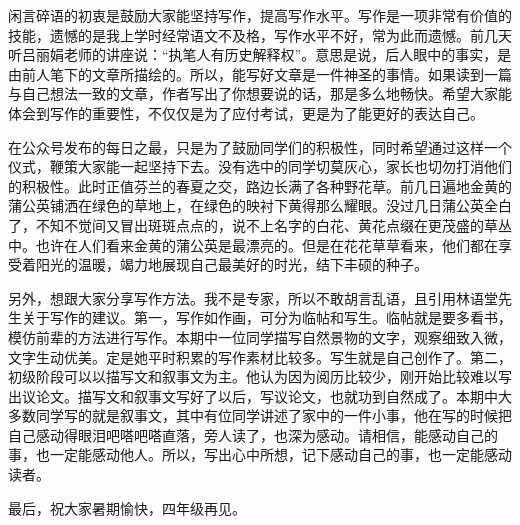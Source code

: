 闲言碎语的初衷是鼓励大家能坚持写作，提高写作水平。写作是一项非常有价值的技能，遗憾的是我上学时经常语文不及格，写作水平不好，常为此而遗憾。前几天听吕丽娟老师的讲座说：``执笔人有历史解释权''。意思是说，后人眼中的事实，是由前人笔下的文章所描绘的。所以，能写好文章是一件神圣的事情。如果读到一篇与自己想法一致的文章，作者写出了你想要说的话，那是多么地畅快。希望大家能体会到写作的重要性，不仅仅是为了应付考试，更是为了能更好的表达自己。

在公众号发布的每日之最，只是为了鼓励同学们的积极性，同时希望通过这样一个仪式，鞭策大家能一起坚持下去。没有选中的同学切莫灰心，家长也切勿打消他们的积极性。此时正值芬兰的春夏之交，路边长满了各种野花草。前几日遍地金黄的蒲公英铺洒在绿色的草地上，在绿色的映衬下黄得那么耀眼。没过几日蒲公英全白了，不知不觉间又冒出斑斑点点的，说不上名字的白花、黄花点缀在更茂盛的草丛中。也许在人们看来金黄的蒲公英是最漂亮的。但是在花花草草看来，他们都在享受着阳光的温暖，竭力地展现自己最美好的时光，结下丰硕的种子。

另外，想跟大家分享写作方法。我不是专家，所以不敢胡言乱语，且引用林语堂先生关于写作的建议。第一，写作如作画，可分为临帖和写生。临帖就是要多看书，模仿前辈的方法进行写作。本期中一位同学描写自然景物的文字，观察细致入微，文字生动优美。定是她平时积累的写作素材比较多。写生就是自己创作了。第二，初级阶段可以以描写文和叙事文为主。他认为因为阅历比较少，刚开始比较难以写出议论文。描写文和叙事文写好了以后，写议论文，也就功到自然成了。本期中大多数同学写的就是叙事文，其中有位同学讲述了家中的一件小事，他在写的时候把自己感动得眼泪吧嗒吧嗒直落，旁人读了，也深为感动。请相信，能感动自己的事，也一定能感动他人。所以，写出心中所想，记下感动自己的事，也一定能感动读者。

最后，祝大家暑期愉快，四年级再见。
